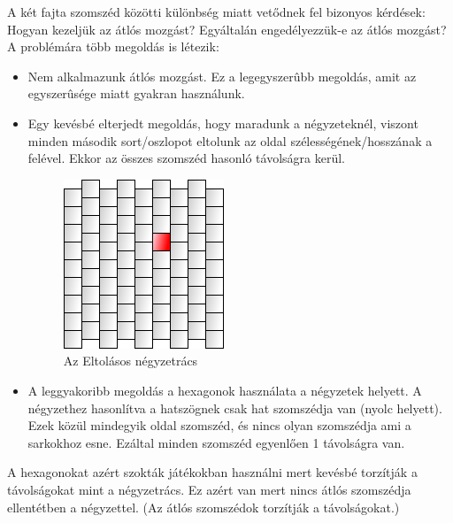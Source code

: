 \noindent A két fajta szomszéd közötti különbség miatt vetődnek fel bizonyos kérdések:
\newline
\newline Hogyan kezeljük az átlós mozgást? 
\newline Egyáltalán engedélyezzük-e az átlós mozgást? 
\newline
\newline A problémára több megoldás is létezik:

\begin{itemize}
\item Nem alkalmazunk átlós mozgást. Ez a legegyszerûbb megoldás, amit az egyszerûsége miatt gyakran használunk.
\item Egy kevésbé elterjedt megoldás, hogy maradunk a négyzeteknél, viszont minden második sort/oszlopot eltolunk az oldal szélességének/hosszának a felével. Ekkor az összes szomszéd hasonló távolságra kerül.

\begin{figure}[h]
\centering
\includegraphics[scale=0.4]{kepek/img22.png}
\caption{Az Eltolásos négyzetrács}
\label{fig:img22}
\end{figure}

\item A leggyakoribb megoldás a hexagonok használata a négyzetek helyett. A négyzethez hasonlítva a hatszögnek csak hat szomszédja van (nyolc helyett). Ezek közül mindegyik oldal szomszéd, és nincs olyan szomszédja ami a sarkokhoz esne. Ezáltal minden szomszéd egyenlően 1 távolságra van.
\end{itemize}

\noindent A hexagonokat azért szokták játékokban használni mert kevésbé torzítják a távolságokat mint a négyzetrács. Ez azért van mert nincs átlós szomszédja ellentétben a négyzettel. (Az átlós szomszédok torzítják a távolságokat.)

